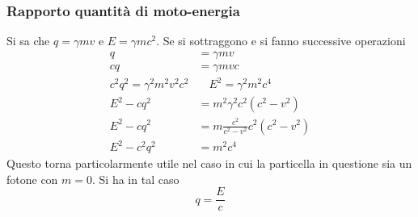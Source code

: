 \subsubsection{Rapporto quantità di moto-energia}
Si sa che $q=\gamma mv$ e $E=\gamma mc^2$. Se si sottraggono e si fanno successive operazioni
\begin{align*}
  q&=\gamma mv\\
  cq&=\gamma mvc\\
  c^2q^2=\gamma^2m^2v^2c^2&\quad E^2=\gamma^2m^2c^4\\
  E^2-cq^2&=m^2\gamma^2c^2(c^2-v^2)\\
  E^2-cq^2&=m\frac{c^2}{c^2-v^2}c^2(c^2-v^2)\\
  E^2-c^2q^2&=m^2c^4
\end{align*}
Questo torna particolarmente utile nel caso in cui la particella in questione sia un fotone con
$m=0$. Si ha in tal caso
\begin{equation*}
  q=\frac{E}{c}
\end{equation*}
